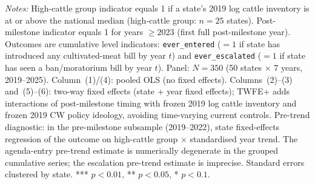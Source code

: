 \documentclass[12pt]{article}
\begin{document}
\begin{appendices}
\begin{table}[htbp]
\centering
\begin{threeparttable}
\caption{Binary High-Cattle Timing Comparison Around Federal Commercialization Milestones}
\label{tab:did_binary}
\scriptsize

\begin{tablenotes}[flushleft]
\footnotesize
\item \textit{Notes:} High-cattle group indicator equals 1 if a state's 2019 log cattle inventory is at or above the national median (high-cattle group: $n=25$ states).  Post-milestone indicator equals 1 for years $\geq 2023$ (first full post-milestone year).  Outcomes are cumulative level indicators: \texttt{ever\_entered} ($= 1$ if state has introduced any cultivated-meat bill by year $t$) and \texttt{ever\_escalated} ($= 1$ if state has seen a ban/moratorium bill by year $t$).  Panel: $N = 350$ (50 states $\times$ 7 years, 2019--2025).  Column~(1)/(4): pooled OLS (no fixed effects).  Columns~(2)--(3) and~(5)--(6): two-way fixed effects (state + year fixed effects); TWFE+ adds interactions of post-milestone timing with frozen 2019 log cattle inventory and frozen 2019 CW policy ideology, avoiding time-varying current controls.  Pre-trend diagnostic: in the pre-milestone subsample (2019--2022), state fixed-effects regression of the outcome on high-cattle group $\times$ standardised year trend.  The agenda-entry pre-trend estimate is numerically degenerate in the grouped cumulative series; the escalation pre-trend estimate is imprecise.  Standard errors clustered by state.  *** $p<0.01$, ** $p<0.05$, * $p<0.1$.
\end{tablenotes}
\end{threeparttable}
\end{table}


\end{appendices}
\end{document}

